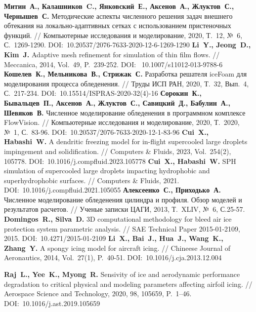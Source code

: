 \begin{thebibliography}{99}
\textbf{Митин~А., Калашников~C., Янковский~Е., Аксенов~А., Жлуктов~С., Чернышев~С.} Методические аспекты численного решения задач внешнего обтекания на локально-адаптивных сетках с использованием пристеночных функций. // Компьютерные исследования и моделирование, 2020, Т.~12, №~6, С.~1269-1290. DOI:~10.20537/2076-7633-2020-12-6-1269-1290
\textbf{Li~Y., Jeong~D., Kim~J.} Adaptive mesh refinement for simulation of thin film flows. // Meccanica, 2014, Vol.~49, P.~239-252. DOI:~ 10.1007/s11012-013-9788-6
\textbf{Кошелев~К., Мельникова~В., Стрижак~С.} Разработка решателя iceFoam для моделирования процесса обледенения. // Труды ИСП РАН, 2020, Т.~32, Вып.~4, С.~217-234. DOI:~10.15514/ISPRAS-2020-32(4)-16
\textbf{Сорокин~К., Бывальцев~П., Аксенов~А., Жлуктов~С., Савицкий~Д., Бабулин~А., Шевяков~В.} Численное моделирование обледенения в программном комплексе FlowVision. // Компьютерные исследования и моделирование, 2020, Т.~2020, №~1, С.~83-96. DOI:~10.20537/2076-7633-2020-12-1-83-96
\textbf{Cui~X., Habashi~W.} A dendritic freezing model for in-flight supercooled large droplets impingement and solidification. // Computers \& Fluids, 2023, Vol.~254(2), 105778. DOI:~10.1016/j.compfluid.2023.105778
\textbf{Cui~X., Habashi~W.} SPH simulation of supercooled large droplets impacting hydrophobic and superhydrophobic surfaces. // Computers \& Fluids, 2021. DOI:~10.1016/j.compfluid.2021.105055
\textbf{Алексеенко~С., Приходько~А.} Численное моделирование обледенения цилиндра и профиля. Обзор моделей и результатов расчетов. // Ученые записки ЦАГИ, 2013, Т.~XLIV, №~6, С.25-57.
\textbf{Domingos~R., Silva~D.} 3D computational methodology for bleed air ice protection system parametric analysis. // SAE Technical Paper 2015-01-2109, 2015. DOI:~10.4271/2015-01-2109
\textbf{Li~X., Bai~J., Hua~J., Wang~K., Zhang~Y.} A spongy icing model for aircraft icing. // Chineese Journal of Aeronautics, 2014, Vol.~27(1), P.~40-51. DOI:~10.1016/j.cja.2013.12.004

\textbf{Raj~L., Yee~K., Myong~R.} Sensivity of ice and aerodynamic performance degradation to critical physical and modeling parameters affecting airfoil icing. // Aerospace Science and Technology, 2020, 98, 105659, P.~1–46. DOI:~10.1016/j.ast.2019.105659


\end{thebibliography}
